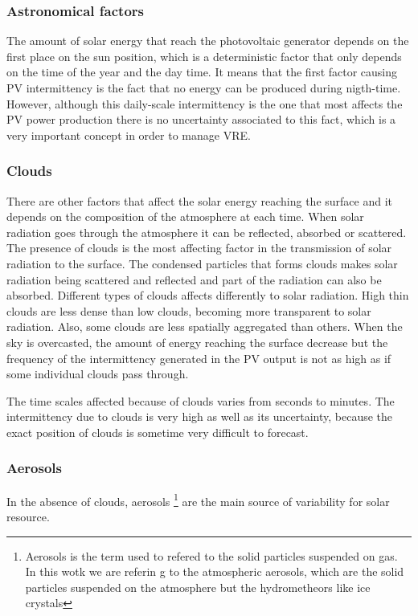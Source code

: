 \subsubsection{Astronomical factors}
The amount of solar energy that reach the photovoltaic generator depends on the first place on the sun position, which is a deterministic factor that only depends on the time of the year and the day time. It means that the first factor causing PV intermittency is the fact that no energy can be produced during nigth-time. However, although this daily-scale intermittency is the one that most affects the PV power production there is no uncertainty associated to this fact, which is a very important concept in order to manage VRE.

\subsubsection{Clouds}
There are other factors that affect the solar energy reaching the surface and it depends on the composition of the atmosphere at each time. When solar radiation goes through the atmosphere it can be reflected, absorbed or scattered. The presence of clouds is the most affecting factor in the transmission of solar radiation to the surface. The condensed particles that forms clouds makes solar radiation being scattered and reflected and part of the radiation can also be absorbed. Different types of clouds affects differently to solar radiation. High thin clouds are less dense than low clouds, becoming more transparent to solar radiation. Also, some clouds are less spatially aggregated than others. When the sky is overcasted, the amount of energy reaching the surface decrease but the frequency of the intermittency generated in the PV output is not as high as if some individual clouds pass through.

The time scales affected because of clouds varies from seconds to minutes. The intermittency due to clouds is very high as well as its uncertainty, because the exact position of clouds is sometime very difficult to forecast.

\subsubsection{Aerosols}

In the absence of clouds, aerosols \footnote{Aerosols is the term used to refered to the solid particles suspended on gas. In this wotk we are referin g to the atmospheric aerosols, which are the solid particles suspended on the atmosphere but the hydrometheors like ice crystals} are the main source of variability for solar resource. 

